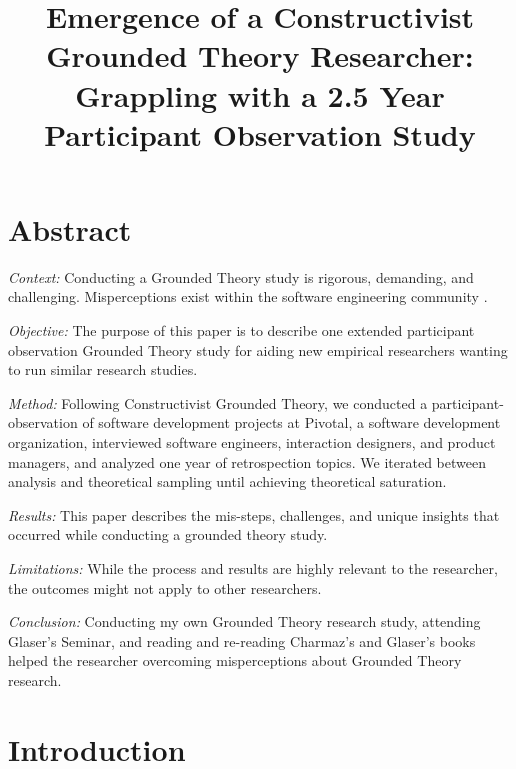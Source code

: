 
\title{Emergence of a Constructivist Grounded Theory Researcher: Grappling with a 2.5 Year Participant Observation Study }

\author{
}
\maketitle

\section{Abstract}
\textit{Context:} Conducting a Grounded Theory study is rigorous, demanding, and challenging. Misperceptions exist within the software engineering community \cite{StolGroundedTheory}.

\textit{Objective:} The purpose of this paper is to describe one extended participant observation Grounded Theory study for aiding new empirical researchers wanting to run similar research studies.

\textit{Method:} Following Constructivist Grounded Theory, we conducted a \durationOfResearchStudy{} participant-observation of \numberOfObservedProjects{} software development projects at Pivotal, a software development organization, interviewed \numberOfInterviews{} software engineers, interaction designers, and product managers, and analyzed one year of retrospection topics. We iterated between analysis and theoretical sampling until achieving theoretical saturation.

\textit{Results:}  This paper describes the mis-steps, challenges, and unique insights that occurred while conducting a grounded theory study.

\textit{Limitations:} While the process and results are highly relevant to the researcher, the outcomes might not apply to other researchers.

\textit{Conclusion:} Conducting my own Grounded Theory research study, attending Glaser’s Seminar, and reading and re-reading Charmaz’s and Glaser’s books helped the researcher overcoming misperceptions about Grounded Theory research.
\section{Introduction}

